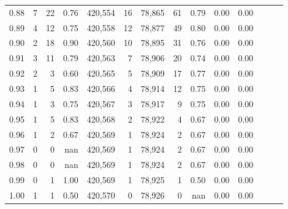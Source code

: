 \begin{tabular}{rrrrrrrrrrrrrr}
0.88 &       7 &     22 &  0.76 &  420,554 &       16 &  78,865 &      61 &  0.79 &  0.00 &      0.00 \\
0.89 &       4 &     12 &  0.75 &  420,558 &       12 &  78,877 &      49 &  0.80 &  0.00 &      0.00 \\
0.90 &       2 &     18 &  0.90 &  420,560 &       10 &  78,895 &      31 &  0.76 &  0.00 &      0.00 \\
0.91 &       3 &     11 &  0.79 &  420,563 &        7 &  78,906 &      20 &  0.74 &  0.00 &      0.00 \\
0.92 &       2 &      3 &  0.60 &  420,565 &        5 &  78,909 &      17 &  0.77 &  0.00 &      0.00 \\
0.93 &       1 &      5 &  0.83 &  420,566 &        4 &  78,914 &      12 &  0.75 &  0.00 &      0.00 \\
0.94 &       1 &      3 &  0.75 &  420,567 &        3 &  78,917 &       9 &  0.75 &  0.00 &      0.00 \\
0.95 &       1 &      5 &  0.83 &  420,568 &        2 &  78,922 &       4 &  0.67 &  0.00 &      0.00 \\
0.96 &       1 &      2 &  0.67 &  420,569 &        1 &  78,924 &       2 &  0.67 &  0.00 &      0.00 \\
0.97 &       0 &      0 &   nan &  420,569 &        1 &  78,924 &       2 &  0.67 &  0.00 &      0.00 \\
0.98 &       0 &      0 &   nan &  420,569 &        1 &  78,924 &       2 &  0.67 &  0.00 &      0.00 \\
0.99 &       0 &      1 &  1.00 &  420,569 &        1 &  78,925 &       1 &  0.50 &  0.00 &      0.00 \\
1.00 &       1 &      1 &  0.50 &  420,570 &        0 &  78,926 &       0 &   nan &  0.00 &      0.00 \\
\bottomrule
\end{tabular}
